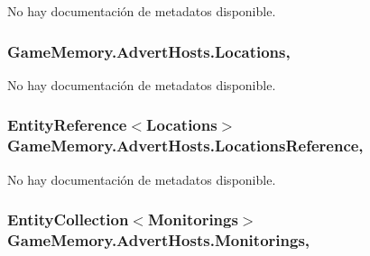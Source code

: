 No hay documentación de metadatos disponible. 

\hypertarget{class_game_memory_1_1_advert_hosts_aecffc47c6b7f5efa56310dda35ef0924}{
\subsubsection[{Locations}]{ Game\-Memory.\-Advert\-Hosts.\-Locations\hspace{0.3cm}{\ttfamily [get]}, {\ttfamily [set]}}}\label{class_game_memory_1_1_advert_hosts_aecffc47c6b7f5efa56310dda35ef0924}


No hay documentación de metadatos disponible. 

\hypertarget{class_game_memory_1_1_advert_hosts_a718933a989867b5853054036455233f3}{
\subsubsection[{Locations\-Reference}]{\setlength{\rightskip}{0pt plus 5cm}Entity\-Reference$<${\bf Locations}$>$ Game\-Memory.\-Advert\-Hosts.\-Locations\-Reference\hspace{0.3cm}{\ttfamily [get]}, {\ttfamily [set]}}}\label{class_game_memory_1_1_advert_hosts_a718933a989867b5853054036455233f3}


No hay documentación de metadatos disponible. 

\hypertarget{class_game_memory_1_1_advert_hosts_a19750c448c029de2b56be189f62245bf}{
\subsubsection[{Monitorings}]{\setlength{\rightskip}{0pt plus 5cm}Entity\-Collection$<${\bf Monitorings}$>$ Game\-Memory.\-Advert\-Hosts.\-Monitorings\hspace{0.3cm}{\ttfamily [get]}, {\ttfamily [set]}}}\label{class_game_memory_1_1_advert_hosts_a19750c448c029de2b56be189f62245bf}


